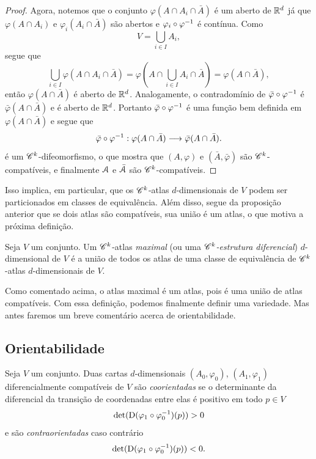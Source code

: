 \begin{proof}
Agora, notemos que o conjunto $\varphi(A \cap A_i \cap \bar A)$ é um aberto de $\mathbb{R}^d$ já que $\varphi(A \cap A_i)$ e $\varphi_i(A_i \cap \bar A)$ são abertos e $\varphi_i \circ \varphi^{-1}$ é contínua. Como
	\begin{equation*}
	V= \bigcup_{i \in I} A_i,
	\end{equation*}
segue que
	\begin{equation*}
	\bigcup_{i \in I} \varphi(A \cap A_i \cap \bar A) = \varphi\left(A \cap \bigcup_{i \in I} A_i \cap \bar A\right) = \varphi(A \cap \bar A),
	\end{equation*}
então $\varphi(A \cap \bar A)$ é aberto de $\mathbb{R}^d$. Analogamente, o contradomínio de $\bar\varphi \circ \varphi^{-1}$ é $\bar\varphi(A \cap \bar A)$ e é aberto de $\mathbb{R}^d$. Portanto $\bar\varphi \circ \varphi^{-1}$ é uma função bem definida em $\varphi(A \cap \bar A)$ e segue que
	\begin{equation*}
	\bar\varphi \circ \varphi^{-1}: \varphi(A \cap \bar A) \longrightarrow \bar\varphi(A \cap \bar A).
	\end{equation*}
é um $\mathscr{C}^k$-difeomorfismo, o que mostra que $(A,\varphi)$ e $(\bar A,\bar\varphi)$ são $\mathscr{C}^k$-compatíveis, e finalmente $\mathcal{A}$ e $\bar{\mathcal{A}}$ são $\mathscr{C}^k$-compatíveis.
\end{proof}

Isso implica, em particular, que os $\mathscr{C}^k$-atlas $d$-dimensionais de $V$ podem ser particionados em classes de equivalência. Além disso, segue da proposição anterior que se dois atlas são compatíveis, sua união é um atlas, o que motiva a próxima definição.

\begin{defi}
Seja $V$ um conjunto. Um $\mathscr{C}^k$-atlas \emph{maximal} (ou uma \emph{$\mathscr{C}^k$-estrutura diferencial}) $d$-dimensional de $V$ é a união de todos os atlas de uma classe de equivalência de $\mathscr{C}^k$-atlas $d$-dimensionais de $V$.
\end{defi}

Como comentado acima, o atlas maximal é um atlas, pois é uma união de atlas compatíveis. Com essa definição, podemos finalmente definir uma variedade. Mas antes faremos um breve comentário acerca de orientabilidade.

\subsection{Orientabilidade}

\begin{defi}
Seja $V$ um conjunto. Duas cartas $d$-dimensionais $(A_0,\varphi_0)$, $(A_1,\varphi_1)$  diferencialmente compatíveis de $V$ são \emph{coorientadas} se o determinante da diferencial da transição de coordenadas entre elas é positivo em todo $p \in V$
	\begin{equation*}
	\det(\mathrm{D}(\varphi_1 \circ \varphi_0^{-1})(p))>0
	\end{equation*}
e são \emph{contraorientadas} caso contrário
	\begin{equation*}
	\det(\mathrm{D}(\varphi_1 \circ \varphi_0^{-1})(p))<0.
	\end{equation*}
\end{defi}

